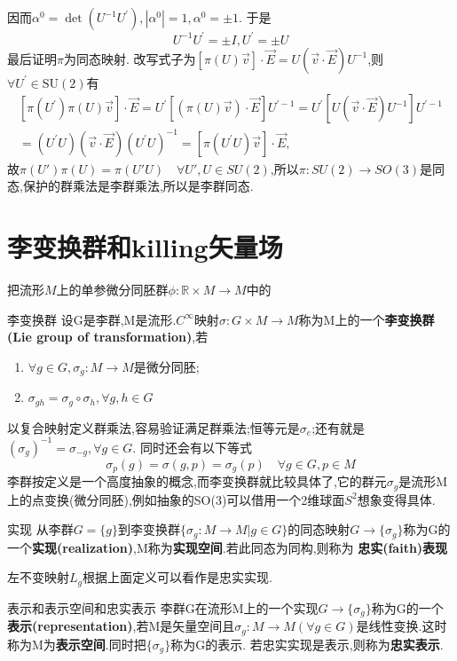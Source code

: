 \documentclass[../main.tex]{subfiles}
\begin{document}
	因而$  \alpha^{0}=\operatorname{det}\left(U^{-1} U^{\prime}\right),\left|\alpha^{0}\right|=1, \alpha^{0}= \pm 1 $. 于是$$  U^{-1} U^{\prime}= \pm I, U^{\prime}= \pm U $$
最后证明$  \pi  $为同态映射.
改写式子为$[\pi(U) \vec{v}] \cdot \vec{E}=U(\vec{v} \cdot \vec{E}) U^{-1}$,则$  \forall U^{\prime} \in \mathrm{SU}(2)  $有
$$\begin{array}{c}{\left[\pi\left(U^{\prime}\right) \pi(U) \vec{v}\right] \cdot \vec{E}=U^{\prime}[(\pi(U) \vec{v}) \cdot \vec{E}] U^{\prime-1}=U^{\prime}\left[U(\vec{v} \cdot \vec{E}) U^{-1}\right] U^{\prime-1}} \\=\left(U^{\prime} U\right)(\vec{v} \cdot \vec{E})\left(U^{\prime} U\right)^{-1}=\left[\pi\left(U^{\prime} U\right) \vec{v}\right] \cdot \vec{E},\end{array}$$
故$\pi(U')\pi(U) = \pi (U'U)\quad \forall U',U \in SU(2)$,所以$\pi : SU(2)\rightarrow SO(3)$是同态,保护的群乘法是李群乘法,所以是李群同态.
\chapter{李变换群和killing矢量场}
把流形$M$上的单参微分同胚群$\phi :\mathbb{R}\times M \rightarrow M$中的
\begin{definition}{}{李变换群}
	设G是李群,M是流形.$C^\infty$映射$\sigma:G\times M \rightarrow M$称为M上的一个\textbf{李变换群(Lie group of transformation)},若
	\begin{enumerate}
		\item $\forall g \in G, \sigma_g:M\rightarrow M $是微分同胚;
		\item $\sigma_{gh} = \sigma_g \circ \sigma_h, \forall g,h \in G$
	\end{enumerate}
\end{definition}
以复合映射定义群乘法,容易验证满足群乘法;恒等元是$\sigma_e$;还有就是$(\sigma_g)^{-1} = \sigma_{-g},\forall g \in G$.
同时还会有以下等式$$\sigma_p(g) = \sigma(g,p) = \sigma_g(p)\quad \forall g\in G, p \in M$$
李群按定义是一个高度抽象的概念,而李变换群就比较具体了,它的群元$\sigma_g$是流形M上的点变换(微分同胚),例如抽象的SO(3)可以借用一个2维球面$S^2$想象变得具体.
\begin{definition}{}{实现}
	从李群$G =\{g\}$到李变换群$\{\sigma_g: M\rightarrow M|g\in G\}$的同态映射$G \rightarrow \{\sigma_g\} $称为G的一个\textbf{实现(realization)},M称为\textbf{实现空间}.若此同态为同构,则称为
	\textbf{忠实(faith)表现}
\end{definition}
\begin{note}
	左不变映射$L_g$根据上面定义可以看作是忠实实现.
\end{note}
\begin{definition}{}{表示和表示空间和忠实表示}
	李群G在流形M上的一个实现$G \rightarrow \{\sigma_g\}$称为G的一个\textbf{表示(representation)},若M是矢量空间且$\sigma_g : M\rightarrow M(\forall g \in G)$是线性变换.这时称为M为\textbf{表示空间}.同时把$\{\sigma_g\}$称为G的表示.
	若忠实实现是表示,则称为\textbf{忠实表示}.
\end{definition}
\end{document}
